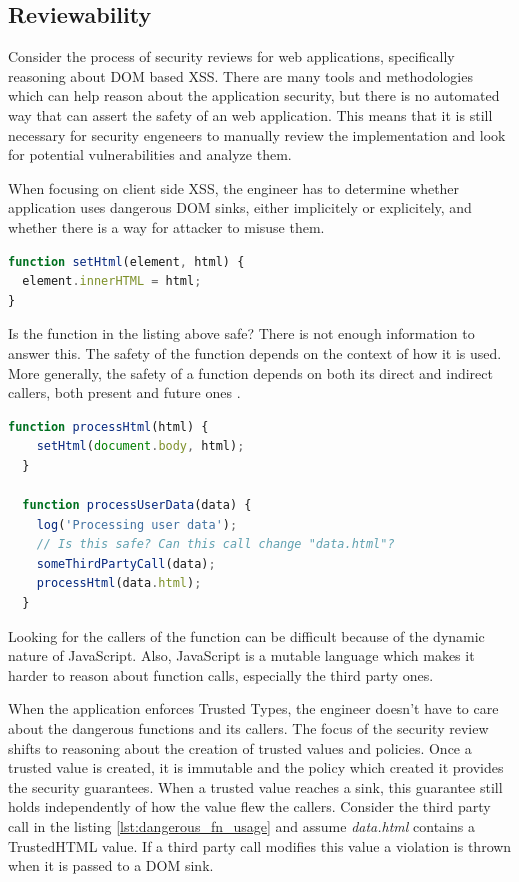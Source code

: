 \subsection{Reviewability}

Consider the process of security reviews for web applications, specifically reasoning about DOM
based XSS. There are many tools and methodologies which can help reason about the application
security, but there is no automated way that can assert the safety of an web application. This means that
it is still necessary for security engeneers to manually review the implementation and look for
potential vulnerabilities and analyze them.

When focusing on client side XSS, the engineer has to determine whether application uses dangerous
DOM sinks, either implicitely or explicitely, and whether there is a way for attacker to misuse them.

\bigskip
\begin{lstlisting}[language=JavaScript, caption=Possibly dangerous function]
function setHtml(element, html) {
  element.innerHTML = html;
}
\end{lstlisting}

Is the function in the listing above safe? There is not enough information to answer this. The
safety of the function depends on the context of how it is used. More generally, the safety of a
function depends on both its direct and indirect callers, both present and future ones
\cite{tt_design_history}.

\bigskip
\begin{lstlisting}[language=JavaScript, caption=Usage of the possibly dangerous function, label={lst:dangerous_fn_usage}]
  function processHtml(html) {
    setHtml(document.body, html);
  }

  function processUserData(data) {
    log('Processing user data');
    // Is this safe? Can this call change "data.html"?
    someThirdPartyCall(data);
    processHtml(data.html);
  }
\end{lstlisting}

Looking for the callers of the function can be difficult because of the dynamic nature of
JavaScript. Also, JavaScript is a mutable language which makes it harder to reason about function
calls, especially the third party ones.

When the application enforces Trusted Types, the engineer doesn't have to care about the dangerous
functions and its callers. The focus of the security review shifts to reasoning about the creation
of trusted values and policies. Once a trusted value is created, it is immutable and the policy
which created it provides the security guarantees. When a trusted value reaches a sink, this
guarantee still holds independently of how the value flew the callers. Consider the third party call
in the listing \ref{lst:dangerous_fn_usage} and assume \textit{data.html} contains a TrustedHTML
value. If a third party call modifies this value a violation is thrown when it is passed to a DOM
sink.

